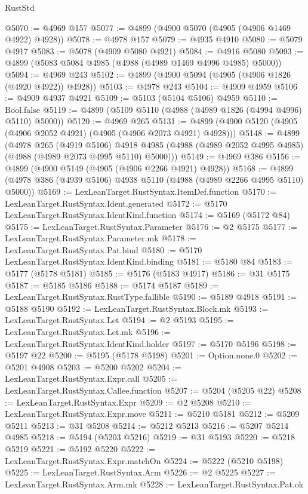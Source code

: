 \begin{lexlean}{RustStd}
\begin{coremodule}
@5070 := @4969 @157
@5077 := @4899 (@4900 @5070 (@4905 (@4906 @1469 @4922) @4928))
@5078 := @4978 @157
@5079 := @4935 @4910
@5080 := @5079 @4917
@5083 := @5078 (@4909 @5080 @4921)
@5084 := @4916 @5080
@5093 := @4899 (@5083 @5084 @4985 (@4988 (@4989 @1469 @4996 @4985) @5000))
@5094 := @4969 @243
@5102 := @4899 (@4900 @5094 (@4905 (@4906 @1826 (@4920 @4922)) @4928))
@5103 := @4978 @243
@5104 := @4909 @4959
@5106 := @4909 @4937 @4921
@5109 := @5103 (@5104 @5106) @4959
@5110 := Bool.false
@5119 := @4899 (@5109 @5110 (@4988 (@4989 @1826 (@4994 @4996) @5110) @5000))
@5120 := @4969 @265
@5131 := @4899 (@4900 @5120 (@4905 (@4906 @2052 @4921) (@4905 (@4906 @2073 @4921) @4928)))
@5148 := @4899
    (@4978
      @265
      (@4919 @5106)
      @4918
      @4985
      (@4988 (@4989 @2052 @4995 @4985) (@4988 (@4989 @2073 @4995 @5110) @5000)))
@5149 := @4969 @386
@5156 := @4899 (@4900 @5149 (@4905 (@4906 @2266 @4921) @4928))
@5168 := @4899 (@4978 @386 (@4939 @5106) @4938 @5110 (@4988 (@4989 @2266 @4995 @5110) @5000))
@5169 := LexLeanTarget.RustSyntax.ItemDef.function
@5170 := LexLeanTarget.RustSyntax.Ident.generated
@5172 := @5170 LexLeanTarget.RustSyntax.IdentKind.function
@5174 := @5169 (@5172 @84)
@5175 := LexLeanTarget.RustSyntax.Parameter
@5176 := @2 @5175
@5177 := LexLeanTarget.RustSyntax.Parameter.mk
@5178 := LexLeanTarget.RustSyntax.Pat.bind
@5180 := @5170 LexLeanTarget.RustSyntax.IdentKind.binding
@5181 := @5180 @84
@5183 := @5177 (@5178 @5181)
@5185 := @5176 (@5183 @4917)
@5186 := @31 @5175
@5187 := @5185 @5186
@5188 := @5174 @5187
@5189 := LexLeanTarget.RustSyntax.RustType.fallible
@5190 := @5189 @4918
@5191 := @5188 @5190
@5192 := LexLeanTarget.RustSyntax.Block.mk
@5193 := LexLeanTarget.RustSyntax.Let
@5194 := @2 @5193
@5195 := LexLeanTarget.RustSyntax.Let.mk
@5196 := LexLeanTarget.RustSyntax.IdentKind.holder
@5197 := @5170 @5196
@5198 := @5197 @22
@5200 := @5195 (@5178 @5198)
@5201 := Option.none.{0}
@5202 := @5201 @4908
@5203 := @5200 @5202
@5204 := LexLeanTarget.RustSyntax.Expr.call
@5205 := LexLeanTarget.RustSyntax.Callee.function
@5207 := @5204 (@5205 @22)
@5208 := LexLeanTarget.RustSyntax.Expr
@5209 := @2 @5208
@5210 := LexLeanTarget.RustSyntax.Expr.move
@5211 := @5210 @5181
@5212 := @5209 @5211
@5213 := @31 @5208
@5214 := @5212 @5213
@5216 := @5207 @5214 @4985
@5218 := @5194 (@5203 @5216)
@5219 := @31 @5193
@5220 := @5218 @5219
@5221 := @5192 @5220
@5222 := LexLeanTarget.RustSyntax.Expr.matchOn
@5224 := @5222 (@5210 @5198)
@5225 := LexLeanTarget.RustSyntax.Arm
@5226 := @2 @5225
@5227 := LexLeanTarget.RustSyntax.Arm.mk
@5228 := LexLeanTarget.RustSyntax.Pat.ok

\end{coremodule}
\end{lexlean}
